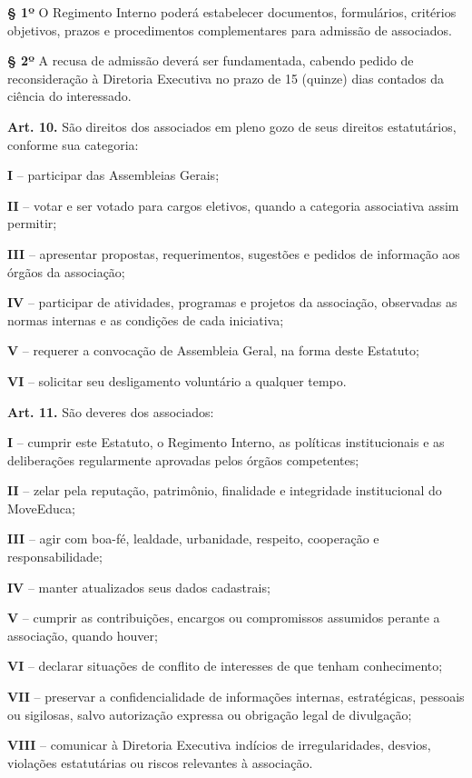 \documentclass[11pt,a4paper]{article}
\begin{document}
\textbf{§ 1º} O Regimento Interno poderá estabelecer documentos, formulários, critérios objetivos, prazos e procedimentos complementares para admissão de associados.

\textbf{§ 2º} A recusa de admissão deverá ser fundamentada, cabendo pedido de reconsideração à Diretoria Executiva no prazo de 15 (quinze) dias contados da ciência do interessado.

\textbf{Art. 10.} São direitos dos associados em pleno gozo de seus direitos estatutários, conforme sua categoria:

\textbf{I} -- participar das Assembleias Gerais;

\textbf{II} -- votar e ser votado para cargos eletivos, quando a categoria associativa assim permitir;

\textbf{III} -- apresentar propostas, requerimentos, sugestões e pedidos de informação aos órgãos da associação;

\textbf{IV} -- participar de atividades, programas e projetos da associação, observadas as normas internas e as condições de cada iniciativa;

\textbf{V} -- requerer a convocação de Assembleia Geral, na forma deste Estatuto;

\textbf{VI} -- solicitar seu desligamento voluntário a qualquer tempo.

\textbf{Art. 11.} São deveres dos associados:

\textbf{I} -- cumprir este Estatuto, o Regimento Interno, as políticas institucionais e as deliberações regularmente aprovadas pelos órgãos competentes;

\textbf{II} -- zelar pela reputação, patrimônio, finalidade e integridade institucional do MoveEduca;

\textbf{III} -- agir com boa-fé, lealdade, urbanidade, respeito, cooperação e responsabilidade;

\textbf{IV} -- manter atualizados seus dados cadastrais;

\textbf{V} -- cumprir as contribuições, encargos ou compromissos assumidos perante a associação, quando houver;

\textbf{VI} -- declarar situações de conflito de interesses de que tenham conhecimento;

\textbf{VII} -- preservar a confidencialidade de informações internas, estratégicas, pessoais ou sigilosas, salvo autorização expressa ou obrigação legal de divulgação;

\textbf{VIII} -- comunicar à Diretoria Executiva indícios de irregularidades, desvios, violações estatutárias ou riscos relevantes à associação.
\end{document}
